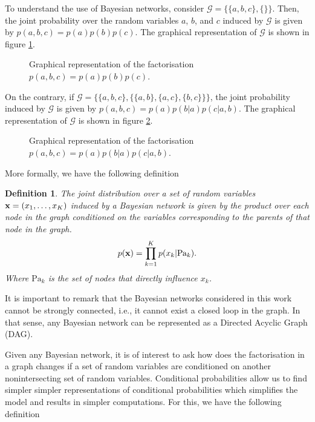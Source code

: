 \documentclass[11pt]{article}
\numberwithin{equation}{section}
\newcommand{\x}{{\bf x}}
\newtheorem{definition}{Definition}[section]
\begin{document}
To understand the use of Bayesian networks, consider $\mathcal G = \{\{a, b, c\}, \{\}\}$. Then, the joint probability over the random variables $a$, $b$, and $c$ induced by $\mathcal G$ is given by $p(a,b,c) = p(a) p(b) p(c)$. The graphical representation of $\mathcal G$ is shown in figure \ref{fig:bayes-net-1}.

\begin{figure}[h!]
	\centering
	
	\caption{Graphical representation of the factorisation $p(a,b,c) = p(a) p(b) p(c)$.}
	\label{fig:bayes-net-1}
\end{figure}

On the contrary, if $\mathcal G = \{\{a,b,c\}, \{\{a, b\}, \{a, c\}, \{b, c\}\}\}$, the joint probability induced by $\mathcal G$ is given by  $p(a,b,c) = p(a)p(b \vert a)p(c \vert a, b)$. The graphical representation of $\mathcal G$ is shown in figure \ref{fig:bayes-net-2}.

\begin{figure}[h!]
	\centering
	
	\caption{Graphical representation of the factorisation $p(a,b,c) = p(a) p(b \vert a) p(c \vert a, b)$.}
	\label{fig:bayes-net-2}
\end{figure}


More formally, we have the following definition
\begin{definition}
	The joint distribution over a set of random variables $\x = (x_1, \ldots, x_K)$ induced by a Bayesian network is given by the product over each node in the graph conditioned on the variables corresponding to the parents of that node in the graph.
	\begin{equation}
		p({\bf x}) = \prod_{k=1}^K p(x_k \vert \text{Pa}_k).
	\end{equation}
	Where $\text{Pa}_k$ is the set of nodes that directly influence $x_k$.
\end{definition}

It is important to remark that the Bayesian networks considered in this work cannot be strongly connected, i.e., it cannot exist a closed loop in the graph. In that sense, any Bayesian network can be represented as a Directed Acyclic Graph (DAG).

Given any Bayesian network, it is of interest to ask how does the factorisation in a graph changes if a set of random variables are conditioned on another nonintersecting set of random variables. Conditional probabilities allow us to find simpler simpler representations of conditional probabilities which simplifies the model and results in simpler computations. For this, we have the following definition
\end{document}
